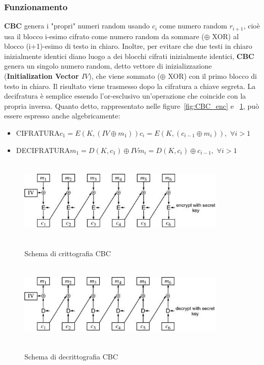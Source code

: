 \subsubsection{Funzionamento}
\textbf{CBC} genera i "propri" numeri random usando $c_{i}$ come numero random $r_{i+1}$, cioè usa il blocco i-esimo cifrato come numero random da sommare ($\oplus$ XOR) al blocco (i+1)-esimo di testo in chiaro.
\newline \newline
Inoltre, per evitare che due testi in chiaro inizialmente identici diano luogo a dei blocchi cifrati inizialmente identici, \textbf{CBC} genera un singolo numero random, detto vettore di inizializzazione (\textbf{Initialization Vector $IV$}), che viene sommato ($\oplus$ XOR) con il primo blocco di testo in chiaro. Il risultato viene trasmesso dopo la cifratura a chiave segreta. La decifratura è semplice essendo l'or-esclusivo un'operazione che coincide con la propria inversa.
\newline \newline
Quanto detto, rappresentato nelle figure~\ref{fig:CBC_enc} e ~\ref{fig:CBC_dec}, può essere espresso anche algebricamente:
\begin{itemize}
\item CIFRATURA\newline $c_{1} = E(K, (IV \oplus m_{1}))$\newline $c_{i} = E(K, (c_{i-1} \oplus m_{i})), \, \, \forall i > 1$
\item DECIFRATURA\newline $m_{1} = D(K,c_{1})\oplus IV$\newline $m_{i} = D(K,c_{i})\oplus c_{i-1}, \, \, \forall i > 1$
\end{itemize}
\begin{figure}[htbp]
	\centering%
	\subfigure%
	{\includegraphics[height=4cm, width=10cm, keepaspectratio]{Immagini/modalita_operative/CBC_enc.png}}
	\caption{Schema di crittografia CBC \label{fig:CBC_enc}} 	
	\subfigure%
	{\includegraphics[height=4cm, width=10cm, keepaspectratio]{Immagini/modalita_operative/CBC_dec.png}}
	\caption{Schema di decrittografia CBC \label{fig:CBC_dec}} 
\end{figure}
